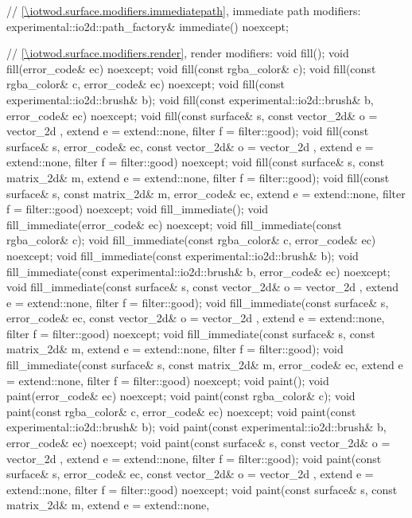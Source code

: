\begin{codeblock}
{{{{{    // \ref{\iotwod.surface.modifiers.immediatepath}, immediate path modifiers:
    experimental::io2d::path_factory& immediate() noexcept;

    // \ref{\iotwod.surface.modifiers.render}, render modifiers:
    void fill();
    void fill(error_code& ec) noexcept;
    void fill(const rgba_color& c);
    void fill(const rgba_color& c, error_code& ec) noexcept;
    void fill(const experimental::io2d::brush& b);
    void fill(const experimental::io2d::brush& b, error_code& ec) noexcept;
    void fill(const surface& s, const vector_2d& o = vector_2d{ },
      extend e = extend::none, filter f = filter::good);
    void fill(const surface& s, error_code& ec,
      const vector_2d& o = vector_2d{ }, extend e = extend::none,
      filter f = filter::good) noexcept;
    void fill(const surface& s, const matrix_2d& m, extend e = extend::none,
      filter f = filter::good);
    void fill(const surface& s, const matrix_2d& m, error_code& ec,
      extend e = extend::none, filter f = filter::good) noexcept;
    void fill_immediate();
    void fill_immediate(error_code& ec) noexcept;
    void fill_immediate(const rgba_color& c);
    void fill_immediate(const rgba_color& c, error_code& ec) noexcept;
    void fill_immediate(const experimental::io2d::brush& b);
    void fill_immediate(const experimental::io2d::brush& b, error_code& ec)
      noexcept;
    void fill_immediate(const surface& s, const vector_2d& o = vector_2d{ }, 
      extend e = extend::none, filter f = filter::good);
    void fill_immediate(const surface& s, error_code& ec,
      const vector_2d& o = vector_2d{ }, extend e = extend::none,
      filter f = filter::good) noexcept;
    void fill_immediate(const surface& s, const matrix_2d& m,
      extend e = extend::none, filter f = filter::good);
    void fill_immediate(const surface& s, const matrix_2d& m, error_code& ec,
      extend e = extend::none, filter f = filter::good) noexcept;
    void paint();
    void paint(error_code& ec) noexcept;
    void paint(const rgba_color& c);
    void paint(const rgba_color& c, error_code& ec) noexcept;
    void paint(const experimental::io2d::brush& b);
    void paint(const experimental::io2d::brush& b, error_code& ec) noexcept;
    void paint(const surface& s, const vector_2d& o = vector_2d{ },
      extend e = extend::none, filter f = filter::good);
    void paint(const surface& s, error_code& ec,
      const vector_2d& o = vector_2d{ }, extend e = extend::none,
      filter f = filter::good) noexcept;
    void paint(const surface& s, const matrix_2d& m, extend e = extend::none,
}}}}}
\end{codeblock}
